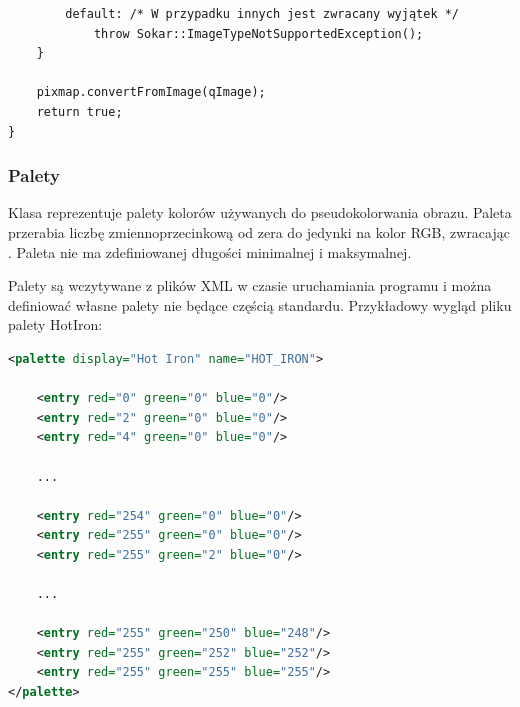 \begin{itemize}
\begin{lstlisting}
        default: /* W przypadku innych jest zwracany wyjątek */
            throw Sokar::ImageTypeNotSupportedException();
    }

    pixmap.convertFromImage(qImage);
    return true;
}
\end{lstlisting}
\end{itemize}

\subsubsection{Palety}
Klasa  reprezentuje palety kolorów używanych do pseudokolorwania obrazu.
Paleta przerabia liczbę zmiennoprzecinkową od zera do jedynki na kolor RGB, zwracając .
Paleta nie ma zdefiniowanej długości minimalnej i maksymalnej.

\par
Palety są wczytywane z plików XML w czasie uruchamiania programu i można definiować własne palety nie będące częścią standardu.
Przykładowy wygląd pliku palety HotIron:
\begin{lstlisting}[language=XML]
<palette display="Hot Iron" name="HOT_IRON">

    <entry red="0" green="0" blue="0"/>
    <entry red="2" green="0" blue="0"/>
    <entry red="4" green="0" blue="0"/>

    ...

    <entry red="254" green="0" blue="0"/>
    <entry red="255" green="0" blue="0"/>
    <entry red="255" green="2" blue="0"/>

    ...

    <entry red="255" green="250" blue="248"/>
    <entry red="255" green="252" blue="252"/>
    <entry red="255" green="255" blue="255"/>
</palette>
\end{lstlisting}